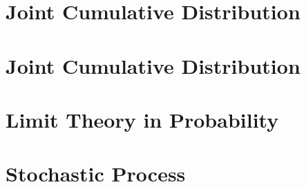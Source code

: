 \chapterspaceabove{6.75cm} 
\chapterspacebelow{7.25cm} 
\chapter{Joint Cumulative Distribution}



\chapterspaceabove{6.75cm} 
\chapterspacebelow{7.25cm} 
\chapter{Joint Cumulative Distribution}



\chapterspaceabove{6.75cm} 
\chapterspacebelow{7.25cm} 
\chapter{Limit Theory in Probability}


\chapterspaceabove{6.75cm} 
\chapterspacebelow{7.25cm} 
\chapter{Stochastic Process}